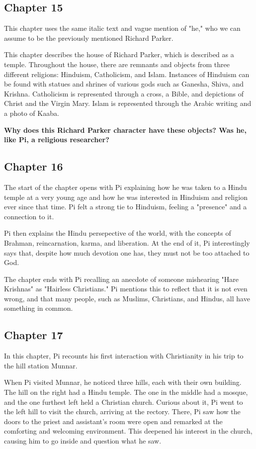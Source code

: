 \documentclass[11pt]{article}
\begin{document}
\subsection{Chapter 15}
\label{sec:org0b16682}
This chapter uses the same italic text and vague mention of "he," who we can assume to be the previously mentioned Richard Parker.

This chapter describes the house of Richard Parker, which is described as a temple. Throughout the house, there are remnants and objects from three different religions: Hinduism, Catholicism, and Islam. Instances of Hinduism can be found with statues and shrines of various gods such as Ganesha, Shiva, and Krishna. Catholicism is represented through a cross, a Bible, and depictions of Christ and the Virgin Mary. Islam is represented through the Arabic writing and a photo of Kaaba.

\textbf{Why does this Richard Parker character have these objects? Was he, like Pi, a religious researcher?}
\subsection{Chapter 16}
\label{sec:orgbf56ee9}
The start of the chapter opens with Pi explaining how he was taken to a Hindu temple at a very young age and how he was interested in Hinduism and religion ever since that time. Pi felt a strong tie to Hinduism, feeling a "presence" and a connection to it.

Pi then explains the Hindu persepective of the world, with the concepts of Brahman, reincarnation, karma, and liberation. At the end of it, Pi interestingly says that, despite how much devotion one has, they must not be too attached to God.

The chapter ends with Pi recalling an anecdote of someone mishearing "Hare Krishnas" as "Hairless Christians." Pi mentions this to reflect that it is not even wrong, and that many people, such as Muslims, Christians, and Hindus, all have something in common.
\subsection{Chapter 17}
\label{sec:org1819287}
In this chapter, Pi recounts his first interaction with Christianity in his trip to the hill station Munnar.

When Pi visited Munnar, he noticed three hills, each with their own building. The hill on the right had a Hindu temple. The one in the middle had a mosque, and the one furthest left held a Christian church. Curious about it, Pi went to the left hill to visit the church, arriving at the rectory. There, Pi saw how the doors to the priest and assistant's room were open and remarked at the comforting and welcoming environment. This deepened his interest in the church, causing him to go inside and question what he saw.
\end{document}
